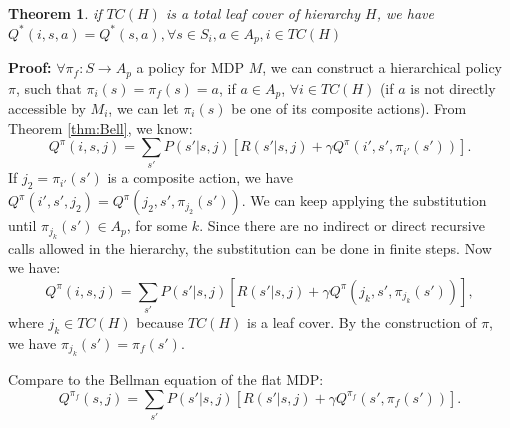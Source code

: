 \documentclass{article} %
\newtheorem{theorem}{Theorem}
\begin{document}

\begin{theorem}
    if $TC(H)$ is a total leaf cover of hierarchy $H$, we have $Q^*(i, s, a) = Q^*(s, a), \forall s \in S_i, a \in A_p, i \in TC(H)$
    \label{thm:opt}
\end{theorem}
\textbf{Proof:} 
    $\forall \pi_f: S \rightarrow A_p$ a policy for MDP $M$, we can construct a hierarchical policy $\pi$, such that
    $\pi_i(s) = \pi_f(s) = a$, if $a \in A_p$, $\forall i \in TC(H)$ (if $a$ is not directly accessible by $M_i$, we can
    let $\pi_i(s)$ be one of its composite actions).
    From Theorem \ref{thm:Bell}, we know: 
    \begin{equation}
        Q^{\pi}(i, s, j) = \sum_{s'}P(s'|s, j)[R(s'|s, j) + \gamma Q^{\pi}(i', s', \pi_{i'}(s'))].
    \end{equation}
    If $j_2= \pi_{i'}(s')$ is a composite action, we have $Q^{\pi}(i', s', j_2) = Q^{\pi}(j_2, s', \pi_{j_2}(s'))$. 
    We can keep applying the substitution until $\pi_{j_k}(s') \in A_p$, for some $k$. Since there are no
    indirect or direct recursive calls allowed in the hierarchy, the substitution can be done in finite 
    steps. Now we have:
    \begin{equation}
        Q^{\pi}(i, s, j) = \sum_{s'}P(s'|s, j)[R(s'|s, j) + \gamma Q^{\pi}(j_k, s', \pi_{j_k}(s'))],
        \label{eq:MaxIrr}
    \end{equation}
    where $j_k \in TC(H)$ because $TC(H)$ is a leaf cover.
    By the construction of $\pi$, we have $\pi_{j_k}(s') = \pi_f(s')$.
    
    Compare to the Bellman equation of the flat MDP:
    \begin{equation}
        Q^{\pi_f}(s, j) = \sum_{s'}P(s'|s, j)[R(s'| s, j) + \gamma Q^{\pi_f}(s', \pi_f(s'))].
        \label{eq:bellman}
    \end{equation}
\end{document}
